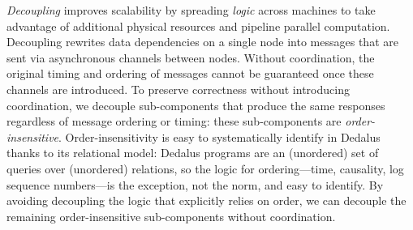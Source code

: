 \textit{Decoupling} improves scalability by spreading \textit{logic} across machines to take advantage of additional physical resources and pipeline parallel computation.
Decoupling rewrites data dependencies on a single node into messages that are sent via asynchronous channels between nodes.
Without coordination, the original timing and ordering of messages cannot be guaranteed once these channels are introduced.
To preserve correctness without introducing coordination, we decouple sub-components that produce the same responses regardless of message ordering or timing: these sub-components are \emph{order-insensitive}.
Order-insensitivity is easy to systematically identify in Dedalus
thanks to its relational model: Dedalus programs are an (unordered) set of queries over (unordered) relations, so the logic for ordering---time, causality, log sequence numbers---is the exception, not the norm, and easy to identify.
By avoiding decoupling the logic that explicitly relies on order, we can decouple the remaining order-insensitive sub-components without coordination.

